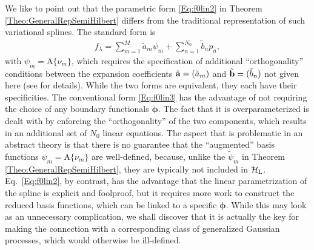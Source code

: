 \documentclass[11pt, english,english]{article}
\newcommand{\Lop}{{\rm L}}
\def\V#1{{\boldsymbol{#1}}}         %
\def\Spc#1{{\mathcal{#1}}}  %
\def\M#1{{\bf{#1}}}  %
\def\Op#1{{\mathrm{#1}}}  %
\renewcommand{\[}{\begin{equation}}
\renewcommand{\]}[1]{\label{eq:#1}\end{equation}}
\begin{document}
We like to point out that the parametric form \eqref{Eq:f0lin2} in Theorem \ref{Theo:GeneralRepSemiHilbert} differs from the traditional representation of such variational splines. The standard form is\begin{align}
\label{Eq:f0lin3}
f_\lambda=\sum_{m=1}^{M} \tilde a_m \psi_m +\sum_{n=1}^{N_0} \tilde b_{n} p_n,
\end{align}
with $\psi_m=\Op A\{\nu_m\}$, which requires the specification of additional ``orthogonality'' conditions between the expansion coefficients $\tilde{\M a}=(\tilde a_m)$ and $\tilde{\M b}=(\tilde b_{n})$ not given here (see \cite{Wahba1990} for details). While the two forms are equivalent, they each have their specificities.
The conventional form \eqref{Eq:f0lin3} has the advantage of not requiring the choice of any boundary functionals $\V \phi$. The fact that it is overparameterized is dealt with by enforcing the ``orthogonality'' of the two components, which results in an additional set of $N_0$ linear equations. The aspect that is problematic in an abstract theory is that there is no guarantee that
the ``augmented'' basis functions $\psi_m=\Op A\{\nu_m\}$ are well-defined, because, unlike the $\widetilde{\psi}_m$ in Theorem \ref{Theo:GeneralRepSemiHilbert}, they are typically not included in $\Spc H_\Lop$.
Eq.~\eqref{Eq:f0lin2}, by contrast, has the advantage that the linear parametrization of the spline is explicit and foolproof, but it requires more work to construct the reduced basis functions, which can be linked to a specific $\V \phi$. While this may look as an unnecessary complication, we shall discover that it is actually the key for making the connection with a corresponding class of generalized Gaussian processes, which would otherwise be ill-defined.
\end{document}
